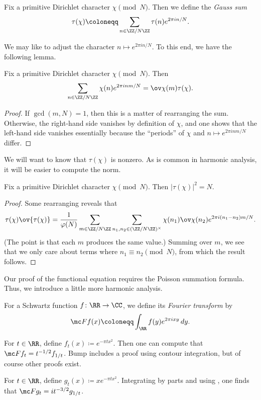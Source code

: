 \documentclass{article}
\begin{document}
\begin{definition}
	Fix a primitive Dirichlet character $\chi\pmod N$. Then we define the \textit{Gauss sum}
	\[\tau(\chi)\coloneqq\sum_{n\in\ZZ/N\ZZ}\tau(n)e^{2\pi in/N}.\]
\end{definition}
We may like to adjust the character $n\mapsto e^{2\pi in/N}$. To this end, we have the following lemma.
\begin{lemma}
	Fix a primitive Dirichlet character $\chi\pmod N$. Then
	\[\sum_{n\in\ZZ/N\ZZ}\chi(n)e^{2\pi inm/N}=\ov\chi(m)\tau(\chi).\]
\end{lemma}
\begin{proof}
	If $\gcd(m,N)=1$, then this is a matter of rearranging the sum. Otherwise, the right-hand side vanishes by definition of $\chi$, and one shows that the left-hand side vanishes essentially because the ``periods'' of $\chi$ and $n\mapsto e^{2\pi inm/N}$ differ.
\end{proof}
We will want to know that $\tau(\chi)$ is nonzero. As is common in harmonic analysis, it will be easier to compute the norm.
\begin{lemma}
	Fix a primitive Dirichlet character $\chi\pmod N$. Then $\left|\tau(\chi)\right|^2=N$.
\end{lemma}
\begin{proof}
	Some rearranging reveals that
	\[\tau(\chi)\ov{\tau(\chi)}=\frac1{\varphi(N)}\sum_{m\in\ZZ/N\ZZ}\sum_{n_1,n_2\in(\ZZ/N\ZZ)^\times}\chi(n_1)\ov\chi(n_2)e^{2\pi i(n_1-n_2)m/N}.\]
	(The point is that each $m$ produces the same value.) Summing over $m$, we see that we only care about terms where $n_1\equiv n_2\pmod N$, from which the result follows.
\end{proof}
Our proof of the functional equation requires the Poisson summation formula. Thus, we introduce a little more harmonic analysis.
\begin{definition}
	For a Schwartz function $f\colon\RR\to\CC$, we define its \textit{Fourier transform} by
	\[\mc Ff(x)\coloneqq\int_\RR f(y)e^{2\pi ixy}\,dy.\]
\end{definition}
\begin{example} \label{ex:fourier-transform-gaussian}
	For $t\in\RR$, define $f_t(x)\coloneqq e^{-\pi tx^2}$. Then one can compute that $\mc Ff_t=t^{-1/2}f_{1/t}$. Bump includes a proof using contour integration, but of course other proofs exist.
\end{example}
\begin{example} \label{ex:fourier-transform-almost-gaussian}
	For $t\in\RR$, define $g_t(x)\coloneqq xe^{-\pi tx^2}$. Integrating by parts and using , one finds that $\mc Fg_t=it^{-3/2}g_{1/t}$.
\end{example}
\end{document}
